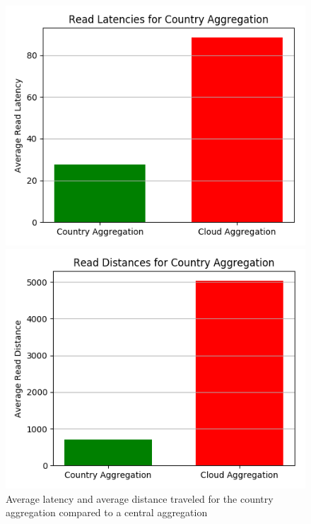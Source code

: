 \begin{figure}[H]
\begin{minipage}{0.49\textwidth}
\centering
\includegraphics[width=1\linewidth]{Figures/Evaluation/read-by-latency-Country-Aggregation.png}
\end{minipage}
\hfill
\begin{minipage}{0.49\textwidth}
\centering
\includegraphics[width=1\linewidth]{Figures/Evaluation/read-by-distance-Country-Aggregation.png}
\end{minipage}
\label{fig:read-by-city}
\caption{Average latency and average distance traveled for the country aggregation compared to a central aggregation}
\end{figure}

